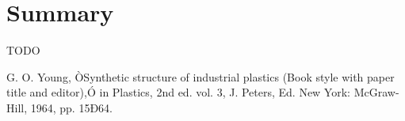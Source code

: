 \documentclass[a4paper, 10 pt, conference]{IEEEtran}
\begin{document}
\section{Summary}

TODO

\addtolength{\textheight}{-12cm}  %

\begin{thebibliography}{99}

 G. O. Young, ÒSynthetic structure of industrial plastics (Book style with paper title and editor),Ó 	in Plastics, 2nd ed. vol. 3, J. Peters, Ed.  New York: McGraw-Hill, 1964, pp. 15Ð64.

\end{thebibliography}
\end{document}
